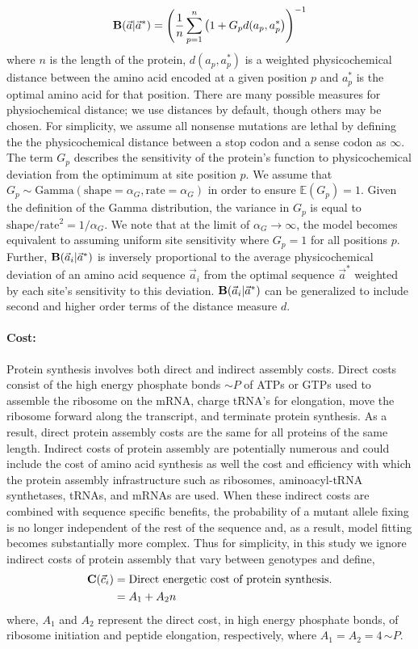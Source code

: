 \documentclass[onecolumn,letterpaper,fleqn,nogrid]{myMBE}%
\newcommand{\PC}{physicochemical\xspace}
\newcommand{\Costcveci}{\ensuremath{\Cost(\cveci)}\xspace}
\newcommand{\Cost}{\ensuremath{\text{\textbf{C}}}\xspace}
\newcommand{\EE}{\mathbb{E}} %
\newcommand{\Funcaveci}{\ensuremath{\Func(\aveci|\aoptvec)}\xspace}
\newcommand{\Funcavec}{\ensuremath{\Func(\avec|\aoptvec)}\xspace}
\newcommand{\Func}{\ensuremath{\text{\textbf{B}}}\xspace}
\newcommand{\simP}{\ensuremath{\sim P}\xspace}
\newcommand{\alphag}{\ensuremath{\alpha_G}\xspace}
\newcommand{\aoptp}{\ensuremath{a^*_p}\xspace}
\newcommand{\aoptvec}{\ensuremath{\Vec{a}^*}\xspace}
\newcommand{\aveci}{\ensuremath{\Vec{a}_i}\xspace}
\newcommand{\avec}{\ensuremath{\Vec{a}}\xspace}
\newcommand{\cveci}{\ensuremath{\cvec_i}\xspace}
\newcommand{\cvec}{\ensuremath{\Vec{c}}\xspace}
\newcommand{\gp}{\ensuremath{{G_p}}\xspace}
\begin{document}
\begin{equation}
\Funcavec = \left(\frac{1}{n} \sum_{p=1}^n \left(1 + \gp d(a_p, \aoptp\right)\right)^{-1}
\end{equation}
where $n$ is the length of the protein, $d(a_p, \aoptp)$ is a weighted physicochemical distance between the amino acid encoded at a given position $p$ and $\aoptp$ is the optimal amino acid for that position.
There are many possible measures for physiochemical distance; we use \citet{Grantham1974} distances by default, though others may be chosen.
For simplicity, we assume all nonsense mutations are lethal by defining the the \PC distance between a stop codon and a sense codon as $\infty$.
The term \gp describes the sensitivity of the protein's function to physicochemical deviation from the optimimum at site position $p$.
We assume that $\gp \sim \text{Gamma}\left(\text{shape} = \alphag, \text{rate} = \alphag\right)$ in order to ensure $\EE(\gp) = 1$.
Given the definition of the Gamma distribution, the variance in \gp is equal to $\text{shape}/\text{rate}^2 = 1/\alphag$.
We note that at the limit of $\alphag \rightarrow \infty$, the model becomes equivalent to assuming uniform site sensitivity where $\gp = 1$ for all positions $p$.
Further, \Funcaveci is inversely proportional to the average physicochemical deviation of an amino acid sequence \aveci from the optimal sequence \aoptvec weighted by each site's sensitivity to this deviation.
\Funcaveci can be generalized to include second and higher order terms of the distance measure $d$.


\paragraph{Cost:}
Protein synthesis involves both direct and indirect assembly costs.
Direct costs consist of the high energy phosphate bonds \simP of ATPs or GTPs used to assemble the ribosome on the mRNA, charge tRNA's for elongation, move the ribosome forward along the transcript, and terminate protein synthesis.
As a result, direct protein assembly costs are the same for all proteins of the same length.
Indirect costs of protein assembly are potentially numerous and could include the cost of amino acid synthesis as well the cost and efficiency with which the protein assembly infrastructure such as ribosomes, aminoacyl-tRNA synthetases, tRNAs, and mRNAs are used.
When these indirect costs are combined with sequence specific benefits, the probability of a mutant allele fixing is no longer independent of the rest of the sequence \citep{GilchristEtAl2015} and, as a result, model fitting becomes substantially more complex.
Thus for simplicity, in this study we ignore indirect costs of protein assembly that vary between genotypes and define,
\begin{align*}
  \Costcveci  &= \text{Direct energetic cost of protein synthesis.} \\
  &= A_1 + A_2 n %
\end{align*}
where, $A_1$ and $A_2$ represent the direct cost, in high energy phosphate bonds, of ribosome initiation and peptide elongation, respectively, where $A_1 = A_2 = 4  \, \simP$.
\end{document}

